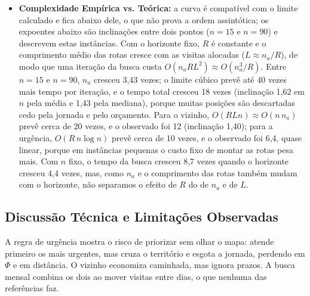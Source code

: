 \documentclass[11pt,a4paper]{article}
\begin{document}
\begin{itemize}
    \item \textbf{Complexidade Empírica vs. Teórica:} a curva é compatível com o limite calculado e fica abaixo dele, o que não prova a ordem assintótica; os expoentes abaixo são inclinações entre dois pontos ($n=15$ e $n=90$) e descrevem estas instâncias. Com o horizonte fixo, $R$ é constante e o comprimento médio das rotas cresce com as visitas alocadas ($L \approx n_a/R$), de modo que uma iteração da busca custa $O(n_a R L^2) \approx O(n_a^3/R)$. Entre $n=15$ e $n=90$, $n_a$ cresceu 3,43 vezes; o limite cúbico prevê até 40 vezes mais tempo por iteração, e o tempo total cresceu 18 vezes (inclinação 1,62 em $n$ pela média e 1,43 pela mediana), porque muitas posições são descartadas cedo pela jornada e pelo orçamento. Para o vizinho, $O(R L n) \approx O(n\, n_a)$ prevê cerca de 20 vezes, e o observado foi 12 (inclinação 1,40); para a urgência, $O(R\, n\log n)$ prevê cerca de 10 vezes, e o observado foi 6,4, quase linear, porque em instâncias pequenas o custo fixo de montar as rotas pesa mais. Com $n$ fixo, o tempo da busca cresceu 8,7 vezes quando o horizonte cresceu 4,4 vezes, mas, como $n_a$ e o comprimento das rotas também mudam com o horizonte, não separamos o efeito de $R$ do de $n_a$ e de $L$.
\end{itemize}

\subsection{Discussão Técnica e Limitações Observadas}

A regra de urgência mostra o risco de priorizar sem olhar o mapa: atende primeiro os mais urgentes, mas cruza o território e esgota a jornada, perdendo em $\Phi$ e em distância. O vizinho economiza caminhada, mas ignora prazos. A busca mensal combina os dois ao mover visitas entre dias, o que nenhuma das referências faz.
\end{document}
